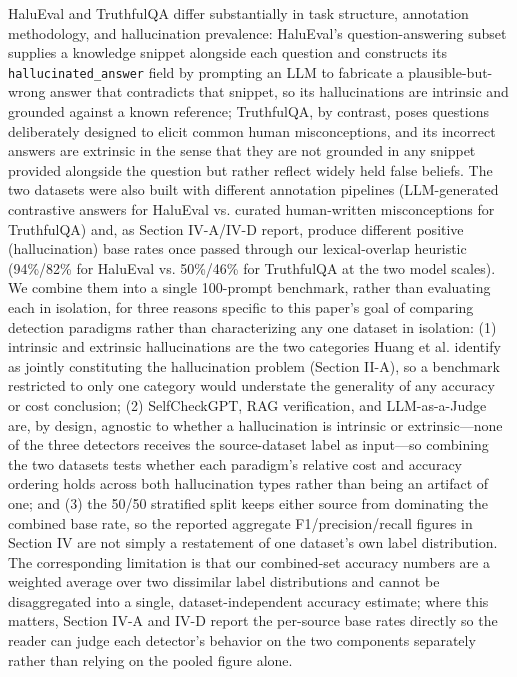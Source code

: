 \documentclass[conference]{IEEEtran}
\begin{document}
HaluEval and TruthfulQA differ substantially in task structure, annotation methodology, and hallucination prevalence: HaluEval's question-answering subset supplies a knowledge snippet alongside each question and constructs its \texttt{hallucinated\_answer} field by prompting an LLM to fabricate a plausible-but-wrong answer that contradicts that snippet, so its hallucinations are intrinsic and grounded against a known reference; TruthfulQA, by contrast, poses questions deliberately designed to elicit common human misconceptions, and its incorrect answers are extrinsic in the sense that they are not grounded in any snippet provided alongside the question but rather reflect widely held false beliefs. The two datasets were also built with different annotation pipelines (LLM-generated contrastive answers for HaluEval vs. curated human-written misconceptions for TruthfulQA) and, as Section IV-A/IV-D report, produce different positive (hallucination) base rates once passed through our lexical-overlap heuristic (94\%/82\% for HaluEval vs. 50\%/46\% for TruthfulQA at the two model scales). We combine them into a single 100-prompt benchmark, rather than evaluating each in isolation, for three reasons specific to this paper's goal of comparing detection paradigms rather than characterizing any one dataset in isolation: (1) intrinsic and extrinsic hallucinations are the two categories Huang et al. \cite{huang2023survey} identify as jointly constituting the hallucination problem (Section II-A), so a benchmark restricted to only one category would understate the generality of any accuracy or cost conclusion; (2) SelfCheckGPT, RAG verification, and LLM-as-a-Judge are, by design, agnostic to whether a hallucination is intrinsic or extrinsic---none of the three detectors receives the source-dataset label as input---so combining the two datasets tests whether each paradigm's relative cost and accuracy ordering holds across both hallucination types rather than being an artifact of one; and (3) the 50/50 stratified split keeps either source from dominating the combined base rate, so the reported aggregate F1/precision/recall figures in Section IV are not simply a restatement of one dataset's own label distribution. The corresponding limitation is that our combined-set accuracy numbers are a weighted average over two dissimilar label distributions and cannot be disaggregated into a single, dataset-independent accuracy estimate; where this matters, Section IV-A and IV-D report the per-source base rates directly so the reader can judge each detector's behavior on the two components separately rather than relying on the pooled figure alone.
\end{document}

